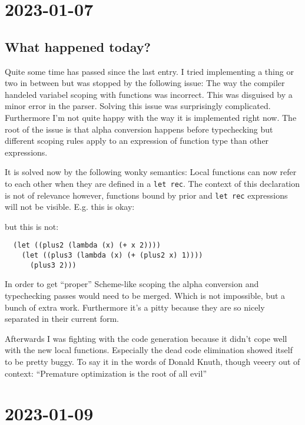 \documentclass[12pt, article]{article}
\begin{document}
\section{2023-01-07}

\subsection{What happened today?}

Quite some time has passed since the last entry.
I tried implementing a thing or two in between but was stopped by the
following issue:
The way the compiler handeled variabel scoping with functions was
incorrect.
This was disguised by a minor error in the parser.
Solving this issue was surprisingly complicated.
Furthermore I'm not quite happy with the way it is implemented right
now.
The root of the issue is that alpha conversion happens before
typechecking but different scoping rules apply to an expression of
function type than other expressions.

It is solved now by the following wonky semantics:
Local functions can now refer to each other when they are defined in a
\lstinline{let rec}.
The context of this declaration is not of relevance however, functions
bound by prior  and \lstinline{let rec} expressions
will not be visible.
E.g. this is okay:



but this is not:

\begin{lstlisting}
  (let ((plus2 (lambda (x) (+ x 2))))
    (let ((plus3 (lambda (x) (+ (plus2 x) 1))))
      (plus3 2)))
\end{lstlisting}

In order to get ``proper'' Scheme-like scoping the alpha conversion
and typechecking passes would need to be merged.
Which is not impossible, but a bunch of extra work.
Furthermore it's a pitty because they are so nicely separated in their
current form.

Afterwards I was fighting with the code generation because it didn't
cope well with the new local functions.
Especially the dead code elimination showed itself to be pretty
buggy.
To say it in the words of Donald Knuth, though veeery out of context:
``Premature optimization is the root of all evil''

\section{2023-01-09}
\end{document}
